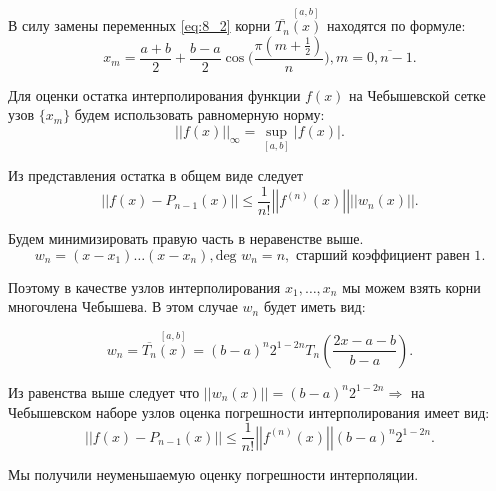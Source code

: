 В силу замены переменных \eqref{eq:8_2} корни $\overline{T_n}\overset{[a, b]}{(x)}$ находятся по формуле:
\begin{equation*}
  x_m = \dfrac{a+b}{2} + \dfrac{b-a}{2} \cos \Big( \dfrac{\pi (m + \frac{1}{2})}{n} \Big), m = \overline{0, n-1}.
\end{equation*}

Для оценки остатка интерполирования функции $f(x)$ на Чебышевской сетке узов $\{ x_m \}$ будем использовать равномерную норму:
\begin{equation*}
  \left| \left| f(x) \right| \right|_{\infty} = \sup\limits_{[a, b]} |f(x)|.
\end{equation*}

Из представления остатка в общем виде следует
\begin{equation*}
  \left| \left| f(x) - P_{n-1}(x) \right| \right| \leqslant \dfrac{1}{n!} \left| \left| f^{(n)}(x) \right| \right|  \left| \left| w_n(x) \right| \right|.
\end{equation*}

Будем минимизировать правую часть в неравенстве выше.
\begin{equation*}
  w_n = (x - x_1) \ldots (x - x_n), \text{deg }w_n = n, \text{ старший коэффициент равен 1}.
\end{equation*}

Поэтому в качестве узлов интерполирования $x_1, \ldots, x_n$ мы можем взять корни многочлена Чебышева. В этом случае $w_n$ будет иметь вид:

\begin{equation*}
  w_n = \overline{T_n}\overset{[a, b]}{(x)} = (b - a)^n 2^{1-2n} T_n \left( \dfrac{2x - a - b}{b - a} \right).
\end{equation*}

Из равенства выше следует что $|| w_n (x) || = (b - a)^n 2^{1-2n} \Rightarrow$ на Чебышевском наборе узлов оценка погрешности интерполирования имеет вид:
\begin{equation*}
  \left| \left| f(x) - P_{n-1}(x) \right| \right| \leqslant \dfrac{1}{n!} \left| \left| f^{(n)}(x) \right| \right| (b - a)^n 2^{1-2n}.
\end{equation*}

Мы получили неуменьшаемую оценку погрешности интерполяции.

